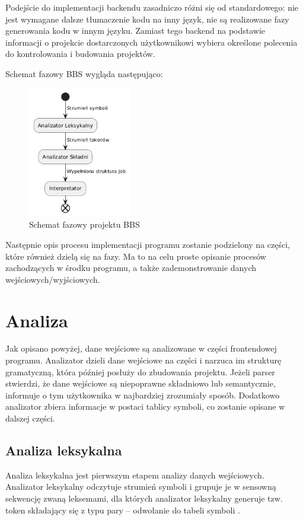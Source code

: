 Podejście do implementacji backendu zasadniczo różni się od standardowego: nie jest wymagane dalsze tłumaczenie kodu na inny język, nie są realizowane fazy generowania kodu w innym języku. Zamiast tego backend na podstawie informacji o projekcie dostarczonych użytkownikowi wybiera określone polecenia do kontrolowania i budowania projektów.

Schemat fazowy BBS wygląda następująco:

\begin{figure}[h]
    \centering
    \includegraphics[width=0.4\textwidth]{Images/phases.png}
    \caption{Schemat fazowy projektu BBS}
\end{figure}

Następnie opis procesu implementacji programu zostanie podzielony na części, które również dzielą się na fazy. Ma to na celu proste opisanie procesów zachodzących w środku programu, a także zademonstrowanie danych wejściowych/wyjściowych.

\section{Analiza}
Jak opisano powyżej, dane wejściowe są analizowane w części frontendowej programu. Analizator dzieli dane wejściowe na części i narzuca im strukturę gramatyczną, która później posłuży do zbudowania projektu. Jeżeli parser stwierdzi, że dane wejściowe są niepoprawne składniowo lub semantycznie, informuje o tym użytkownika w najbardziej zrozumiały sposób. Dodatkowo analizator zbiera informacje w postaci tablicy symboli, co zostanie opisane w dalszej części.

\subsection{Analiza leksykalna}
Analiza leksykalna jest pierwszym etapem analizy danych wejściowych. Analizator leksykalny odczytuje strumień symboli i grupuje je w sensowną sekwencję zwaną leksemami, dla których analizator leksykalny generuje tzw. token składający się z typu pary -- odwołanie do tabeli symboli \cite{compilers}.

